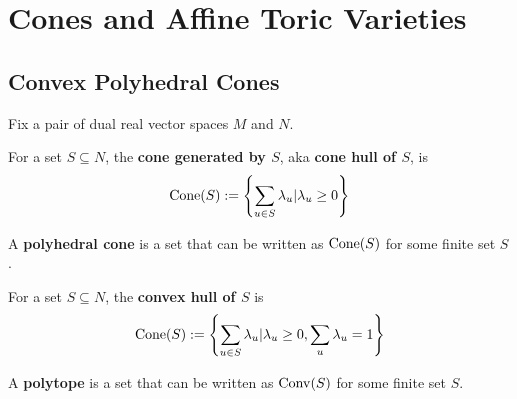 \section{Cones and Affine Toric Varieties}

\subsection{Convex Polyhedral Cones}

Fix a pair of dual real vector spaces $M$ and $N$.

\begin{definition}
  \label{1-2-1-cone-hull}
  \uses{}
  \leanok

  For a set $S \subseteq N$, the {\bf cone generated by $S$}, aka {\bf cone hull of $S$}, is
  $$\operatorname{Cone}(S) := \left\{\sum_{u \in S} \lambda_u | \lambda_u \ge 0\right\}$$
\end{definition}

\begin{definition}
  \label{1-2-1-polyhedral-cone}

  A {\bf polyhedral cone} is a set that can be written as $\operatorname{Cone}(S)$ for some finite set $S$.
\end{definition}

\begin{definition}
  \label{1-2-2-convex-hull}
  \uses{}
  \leanok

  For a set $S \subseteq N$, the {\bf convex hull of $S$} is
  $$\operatorname{Cone}(S) := \left\{\sum_{u \in S} \lambda_u | \lambda_u \ge 0, \sum_u \lambda_u = 1\right\}$$
\end{definition}

\begin{definition}[Polytope]
  \label{1-2-2-polytope}

  A {\bf polytope} is a set that can be written as $\operatorname{Conv}(S)$ for some finite set $S$.
\end{definition}
